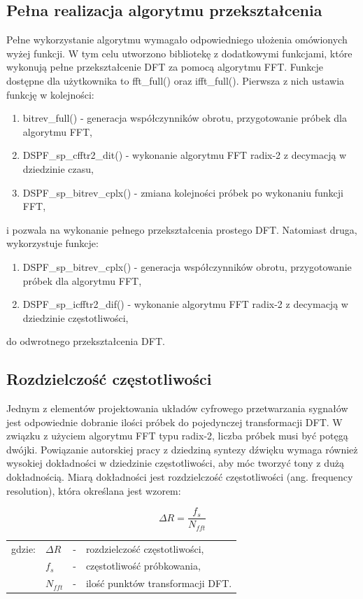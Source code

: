 \subsection{Pełna realizacja algorytmu przekształcenia}
Pełne wykorzystanie algorytmu wymagało odpowiedniego ułożenia omówionych wyżej funkcji. W tym celu utworzono bibliotekę z dodatkowymi funkcjami, które wykonują pełne przekształcenie DFT za pomocą algorytmu FFT. Funkcje dostępne dla użytkownika to fft\_full() oraz ifft\_full(). Pierwsza z nich ustawia funkcję w kolejności:
\begin{enumerate}
	\item bitrev\_full() - generacja współczynników obrotu, przygotowanie próbek dla algorytmu FFT,
	\item DSPF\_sp\_cfftr2\_dit() - wykonanie algorytmu FFT radix-2 z decymacją w dziedzinie czasu,
	\item DSPF\_sp\_bitrev\_cplx() - zmiana kolejności próbek po wykonaniu funkcji FFT,
\end{enumerate}
i pozwala na wykonanie pełnego przekształcenia prostego DFT. Natomiast druga, wykorzystuje funkcje:
\begin{enumerate}
	\item DSPF\_sp\_bitrev\_cplx() - generacja współczynników obrotu, przygotowanie próbek dla algorytmu FFT,
	\item DSPF\_sp\_icfftr2\_dif() - wykonanie algorytmu FFT radix-2 z decymacją w dziedzinie częstotliwości,
\end{enumerate}
do odwrotnego przekształcenia DFT.

\subsection{Rozdzielczość częstotliwości}
Jednym z elementów projektowania układów cyfrowego przetwarzania sygnałów jest odpowiednie dobranie ilości próbek do pojedynczej transformacji DFT. W związku z użyciem algorytmu FFT typu radix-2, liczba próbek musi być potęgą dwójki. Powiązanie autorskiej pracy z dziedziną syntezy dźwięku wymaga również wysokiej dokładności w dziedzinie częstotliwości, aby móc tworzyć tony z dużą dokładnością. Miarą dokładności jest rozdzielczość częstotliwości (ang. frequency resolution), która określana jest wzorem:

\begin{equation} \label{equ:fft_resol}
\Delta R = \frac{f_{s}}{N_{fft}}
\end{equation}
\begin{tabular}{ l l l l}
	gdzie: 	&	$\Delta R$ & - &  rozdzielczość częstotliwości, \\
	&	$f_{s}$ & - &  częstotliwość próbkowania, \\
	&   $N_{fft}$ &  - & ilość punktów transformacji DFT. \\
\end{tabular}

